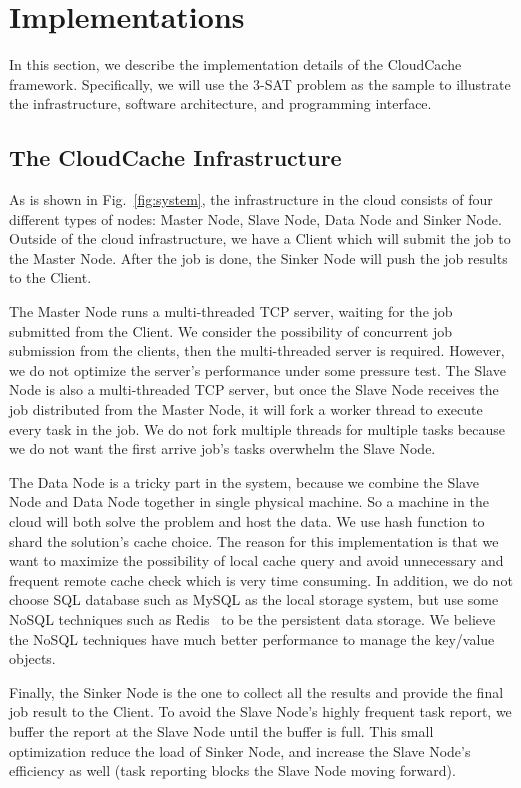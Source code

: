 \section{Implementations}\label{sec:implementation}
In this section, we describe the implementation details of the CloudCache framework. Specifically, we will use the 3-SAT problem as the sample to illustrate the infrastructure, software architecture, and programming interface.

\subsection{The CloudCache Infrastructure}
As is shown in Fig.~\ref{fig:system}, the infrastructure in the cloud consists of four different types of nodes: Master Node, Slave Node, Data Node and Sinker Node. Outside of the cloud infrastructure, we have a Client which will submit the job to the Master Node. After the job is done, the Sinker Node will push the job results to the Client.

The Master Node runs a multi-threaded TCP server, waiting for the job submitted from the Client. We consider the possibility of concurrent job submission from the clients, then the multi-threaded server is required. However, we do not optimize the server's performance under some pressure test. The Slave Node is also a multi-threaded TCP server, but once the Slave Node receives the job distributed from the Master Node, it will fork a worker thread to execute every task in the job. We do not fork multiple threads for multiple tasks because we do not want the first arrive job's tasks overwhelm the Slave Node.

The Data Node is a tricky part in the system, because we combine the Slave Node and Data Node together in single physical machine. So a machine in the cloud will both solve the problem and host the data. We use hash function to shard the solution's cache choice. The reason for this implementation is that we want to maximize the possibility of local cache query and avoid unnecessary and frequent remote cache check which is very time consuming. In addition, we do not choose SQL database such as MySQL as the local storage system, but use some NoSQL techniques such as Redis~\cite{macedo2011redis} to be the persistent data storage. We believe the NoSQL techniques have much better performance to manage the key/value objects.

Finally, the Sinker Node is the one to collect all the results and provide the final job result to the Client. To avoid the Slave Node's highly frequent task report, we buffer the report at the Slave Node until the buffer is full. This small optimization reduce the load of Sinker Node, and increase the Slave Node's efficiency as well (task reporting blocks the Slave Node moving forward).

